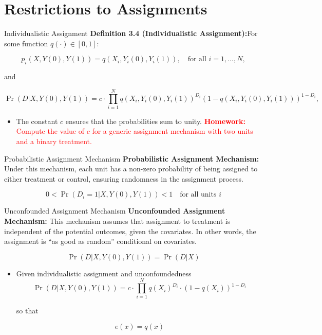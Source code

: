 \documentclass[xcolor=svgnames,t]{beamer}
\begin{document}
\section{Restrictions to Assignments}
\begin{frame}{Individualistic Assignment}
    \textbf{Definition 3.4 (Individualistic Assignment):}For some function \( q( \cdot ) \in [0, 1] \):
    
    \[
    p_i(X, Y(0), Y(1)) = q(X_i, Y_i(0), Y_i(1)), \quad \text{for all } i = 1, \ldots, N,
    \]

    and

    \[
    \Pr(D | X, Y(0), Y(1)) = c \cdot \prod_{i=1}^N q(X_i, Y_i(0), Y_i(1))^{D_i} (1 - q(X_i, Y_i(0), Y_i(1)))^{1 - D_i},
    \]
    \pause
\begin{itemize}
    \item The constant \( c \) ensures that the probabilities sum to unity.
    \pause
    \textcolor{red}{\textbf{Homework:} Compute the value of \( c \) for a generic assignment mechanism with two units and a binary treatment.}

   \end{itemize}
    
    
   
\end{frame}

\begin{frame}{Probabilistic Assignment Mechanism}
    \textbf{Probabilistic Assignment Mechanism:} Under this mechanism, each unit has a non-zero probability of being assigned to either treatment or control, ensuring randomness in the assignment process.
    
    \[
    0 < \Pr(D_i = 1 | X, Y(0), Y(1)) < 1 \quad \text{for all units } i
    \]
    
   
\end{frame}

\begin{frame}{Unconfounded Assignment Mechanism}
    \textbf{Unconfounded Assignment Mechanism:} This mechanism assumes that assignment to treatment is independent of the potential outcomes, given the covariates. In other words, the assignment is “as good as random” conditional on covariates.
    
    \[
    \Pr(D | X, Y(0), Y(1)) = \Pr(D | X)
    \]
   
    \pause
    \begin{itemize}
       
    
        \item  Given individualistic assignment and unconfoundedness\[
\Pr(D | X, Y(0), Y(1)) = c \cdot \prod_{i=1}^N q(X_i)^{D_i} \cdot (1 - q(X_i))^{1 - D_i} 
\]

so that

\[
e(x) = q(x)
\]
    \end{itemize}
        
    
\end{frame}
\end{document}
